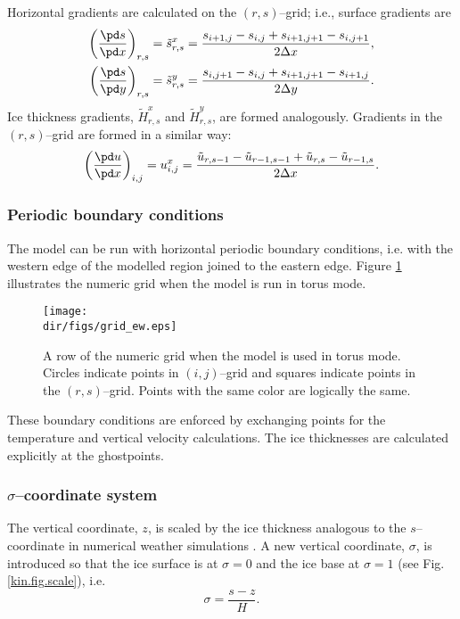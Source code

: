 Horizontal gradients are calculated on the $(r,s)$--grid; i.e., surface gradients are
\begin{subequations}
\begin{align}
  \left(\frac{\pd s}{\pd x}\right)_{r,s}=\tilde{s}^x_{r,s}&=\frac{s_{i+1,j}-s_{i,j}+s_{i+1,j+1}-s_{i,j+1}}{2\Delta x},\\
  \left(\frac{\pd s}{\pd y}\right)_{r,s}=\tilde{s}^y_{r,s}&=\frac{s_{i,j+1}-s_{i,j}+s_{i+1,j+1}-s_{i+1,j}}{2\Delta y}.
\end{align}  
\end{subequations}
Ice thickness gradients, $\tilde{H}^x_{r,s}$ and $\tilde{H}^y_{r,s}$, are formed analogously. Gradients in the $(r,s)$--grid are formed in a similar way: 
\begin{equation}
  \left(\frac{\pd u}{\pd x}\right)_{i,j}=u^x_{i,j}=\frac{\tilde{u}_{r,s-1}-\tilde{u}_{r-1,s-1}+\tilde{u}_{r,s}-\tilde{u}_{r-1,s}}{2\Delta x}.
\end{equation}

\subsubsection{Periodic boundary conditions}
The model can be run with horizontal periodic boundary conditions, i.e. with the western edge of the modelled region joined to the eastern edge. Figure \ref{num.fig.grid_ew} illustrates the numeric grid when the model is run in torus mode.

\begin{figure}[htbp]
  \centering
  \texttt{[image: \\dir/figs/grid\_ew.eps]}
  \caption{A row of the numeric grid when the model is used in torus mode. Circles indicate points in $(i,j)$--grid and squares indicate points in the $(r,s)$--grid. Points with the same color are logically the same.}
  \label{num.fig.grid_ew}
\end{figure}

These boundary conditions are enforced by exchanging points for the temperature and vertical velocity calculations. The ice thicknesses are calculated explicitly at the ghostpoints.

\subsubsection{$\sigma$--coordinate system}\label{num.sec.sigma}
The vertical coordinate, $z$, is scaled by the ice thickness analogous to the $s$--coordinate in numerical weather simulations \citep[e.g.,][]{Holton1992}. A new vertical coordinate, $\sigma$, is introduced so that the ice surface is at $\sigma=0$ and the ice base at $\sigma=1$ (see Fig. \ref{kin.fig.scale}), i.e.
\begin{equation}
  \label{kin.eq.vertical_scale}
  \sigma=\frac{s-z}{H}.
\end{equation}


